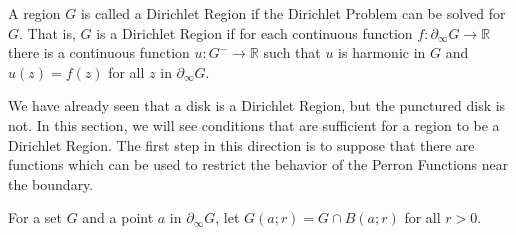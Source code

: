 A region $G$ is called a Dirichlet Region if the Dirichlet Problem can be solved for $G$. That is, $G$ is a Dirichlet Region if for each continuous function $f: \partial_\infty G \to \mathbb{R}$ there is a continuous function $u: G^- \to \mathbb{R}$ such that $u$ is harmonic in $G$ and $u(z) = f(z)$ for all $z$ in $\partial_\infty G$.

We have already seen that a disk is a Dirichlet Region, but the punctured disk is not. In this section, we will see conditions that are sufficient for a region to be a Dirichlet Region. The first step in this direction is to suppose that there are functions which can be used to restrict the behavior of the Perron Functions near the boundary.

For a set $G$ and a point $a$ in $\partial_\infty G$, let $G(a; r) = G \cap B(a; r)$ for all $r > 0$.